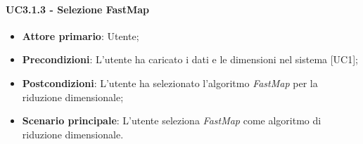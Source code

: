 \paragraph{UC3.1.3 - Selezione FastMap}
\begin{itemize}
	\item \textbf{Attore primario}: Utente;
	\item \textbf{Precondizioni}: L'utente ha caricato i dati e le dimensioni nel sistema [UC1];
	\item \textbf{Postcondizioni}: L'utente ha selezionato l'algoritmo \textit{FastMap} per la riduzione dimensionale;
	\item \textbf{Scenario principale}: L'utente seleziona \textit{FastMap} come algoritmo di riduzione dimensionale.
\end{itemize}